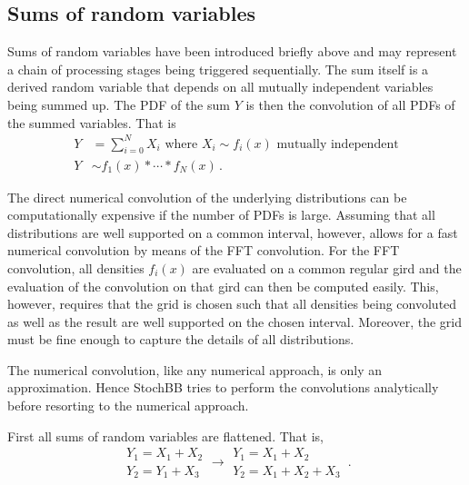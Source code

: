 \documentclass[a4paper, 10pt]{paper}
\begin{document}
\subsection{Sums of random variables}
Sums of random variables have been introduced briefly above and may represent a chain of processing
stages being triggered sequentially. The sum itself is a derived random variable that depends on all
mutually independent variables being summed up. The PDF of the sum $Y$ is then the convolution of all
PDFs of the summed variables. That is
\begin{align}
 Y &= \sum_{i=0}^NX_i\text{ where } X_i \sim f_i(x)\text{ mutually independent} \nonumber \\
 Y &\sim f_1(x) \ast \cdots \ast f_N(x)\,. \nonumber
\end{align}

The direct numerical convolution of the underlying distributions can be computationally expensive if the
number of PDFs is large. Assuming that all distributions are well supported on a common interval, however, 
allows for a fast numerical convolution by means of the FFT convolution. For the FFT convolution, all 
densities $f_i(x)$ are evaluated on a common regular gird and the evaluation of the convolution on that gird
can then be computed easily. This, however, requires that the grid is chosen such that all densities being
convoluted as well as the result are well supported on the chosen interval. Moreover, the grid must be fine 
enough to capture the details of all distributions. 

The numerical convolution, like any numerical approach, is only an approximation. Hence StochBB tries to perform
the convolutions analytically before resorting to the numerical approach. 

First all sums of random variables are flattened. That is, 
\begin{equation}
 \begin{array}{l}
  Y_1 = X_1 + X_2\\
  Y_2 = Y_1 + X_3 
 \end{array} \longrightarrow 
 \begin{array}{l}
  Y_1 = X_1 + X_2\\
  Y_2 = X_1 + X_2 + X_3 
 \end{array}\,. \nonumber
\end{equation}
\end{document}
